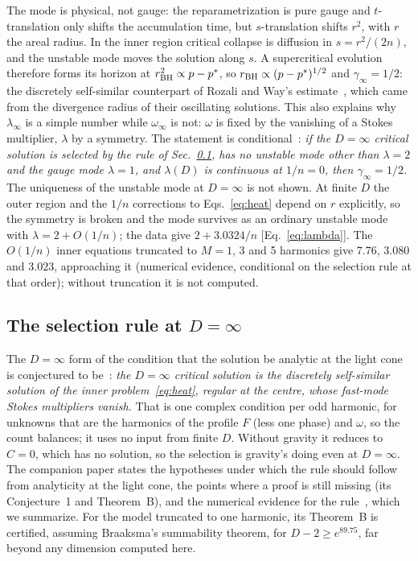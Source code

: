 \documentclass[aps,prd,onecolumn,superscriptaddress,nofootinbib,10pt]{revtex4-2}
\begin{document}
The mode is physical, not gauge: the reparametrization is pure gauge and $t$-translation only shifts the accumulation
time, but $s$-translation shifts $r^2$, with $r$ the areal radius. In the inner region critical collapse is diffusion in
$s = r^2/(2n)$, and the unstable mode moves the solution along $s$. A supercritical evolution therefore forms its horizon
at $r_{\rm BH}^2 \propto p - p^*$, so $r_{\rm BH} \propto (p - p^*)^{1/2}$ and $\gamma_\infty = 1/2$: the discretely
self-similar counterpart of Rozali and Way's estimate~\cite{RozaliWay2018}, which came from the divergence radius of their
oscillating solutions. This also explains why $\lambda_\infty$ is a simple number while $\omega_\infty$ is not: $\omega$ is
fixed by the vanishing of a Stokes multiplier, $\lambda$ by a symmetry. The statement is
conditional~\cite[Cor.~1]{math}: \emph{if the
$D = \infty$ critical solution is selected by the rule of Sec.~\ref{sec:selection}, has no unstable mode other than
$\lambda = 2$ and the gauge mode $\lambda = 1$, and $\lambda(D)$ is continuous at $1/n = 0$, then $\gamma_\infty = 1/2$.}
The uniqueness of the unstable mode at $D = \infty$ is not shown. At finite $D$ the outer region and the $1/n$
corrections to Eqs.~\eqref{eq:heat} depend on $r$ explicitly, so the symmetry is broken and the mode survives as an
ordinary unstable mode with $\lambda = 2 + O(1/n)$; the data give $2 + 3.0324/n$ [Eq.~\eqref{eq:lambda}]. The $O(1/n)$
inner equations truncated to $M = 1$, 3 and 5 harmonics give $7.76$, $3.080$ and $3.023$, approaching it (numerical
evidence, conditional on the selection rule at that order); without truncation it is not computed.

\subsection{The selection rule at $D = \infty$}
\label{sec:selection}

The $D = \infty$ form of the condition that the solution be analytic at the light cone is conjectured to
be~\cite[Conj.~1]{math}: \emph{the $D = \infty$ critical solution is the discretely self-similar solution of the inner
problem~\eqref{eq:heat}, regular at the centre, whose fast-mode Stokes multipliers vanish.} That is one complex condition
per odd harmonic, for unknowns that are the harmonics of the profile $F$ (less one phase) and $\omega$, so the count
balances; it uses no input from finite $D$. Without gravity it reduces to $C = 0$, which has no solution, so the
selection is gravity's doing even at $D = \infty$. The companion paper states the hypotheses under which the rule should
follow from analyticity at the light cone, the points where a proof is still missing (its Conjecture~1 and Theorem~B),
and the numerical evidence for the rule~\cite{math}, which we summarize. For the model truncated to one harmonic, its
Theorem~B is certified, assuming Braaksma's summability theorem, for $D - 2 \ge e^{89.75}$, far beyond any dimension
computed here.
\end{document}
